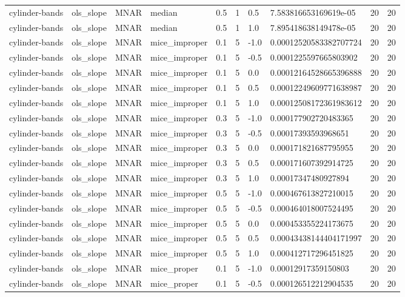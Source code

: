 \begin{tabular}{llllllllll}
cylinder-bands & ols\_slope & MNAR & median & 0.5 & 1 & 0.5 & 7.583816653169619e-05 & 20 & 20 \\
cylinder-bands & ols\_slope & MNAR & median & 0.5 & 1 & 1.0 & 7.895418638149478e-05 & 20 & 20 \\
cylinder-bands & ols\_slope & MNAR & mice\_improper & 0.1 & 5 & -1.0 & 0.00012520583382707724 & 20 & 20 \\
cylinder-bands & ols\_slope & MNAR & mice\_improper & 0.1 & 5 & -0.5 & 0.0001225597665803902 & 20 & 20 \\
cylinder-bands & ols\_slope & MNAR & mice\_improper & 0.1 & 5 & 0.0 & 0.00012164528665396888 & 20 & 20 \\
cylinder-bands & ols\_slope & MNAR & mice\_improper & 0.1 & 5 & 0.5 & 0.00012249609771638987 & 20 & 20 \\
cylinder-bands & ols\_slope & MNAR & mice\_improper & 0.1 & 5 & 1.0 & 0.00012508172361983612 & 20 & 20 \\
cylinder-bands & ols\_slope & MNAR & mice\_improper & 0.3 & 5 & -1.0 & 0.000177902720483365 & 20 & 20 \\
cylinder-bands & ols\_slope & MNAR & mice\_improper & 0.3 & 5 & -0.5 & 0.00017393593968651 & 20 & 20 \\
cylinder-bands & ols\_slope & MNAR & mice\_improper & 0.3 & 5 & 0.0 & 0.000171821687795955 & 20 & 20 \\
cylinder-bands & ols\_slope & MNAR & mice\_improper & 0.3 & 5 & 0.5 & 0.000171607392914725 & 20 & 20 \\
cylinder-bands & ols\_slope & MNAR & mice\_improper & 0.3 & 5 & 1.0 & 0.00017347480927894 & 20 & 20 \\
cylinder-bands & ols\_slope & MNAR & mice\_improper & 0.5 & 5 & -1.0 & 0.000467613827210015 & 20 & 20 \\
cylinder-bands & ols\_slope & MNAR & mice\_improper & 0.5 & 5 & -0.5 & 0.000464018007524495 & 20 & 20 \\
cylinder-bands & ols\_slope & MNAR & mice\_improper & 0.5 & 5 & 0.0 & 0.000453355224173675 & 20 & 20 \\
cylinder-bands & ols\_slope & MNAR & mice\_improper & 0.5 & 5 & 0.5 & 0.00043438144404171997 & 20 & 20 \\
cylinder-bands & ols\_slope & MNAR & mice\_improper & 0.5 & 5 & 1.0 & 0.000412717296451825 & 20 & 20 \\
cylinder-bands & ols\_slope & MNAR & mice\_proper & 0.1 & 5 & -1.0 & 0.00012917359150803 & 20 & 20 \\
cylinder-bands & ols\_slope & MNAR & mice\_proper & 0.1 & 5 & -0.5 & 0.000126512212904535 & 20 & 20 \\

\end{tabular}
